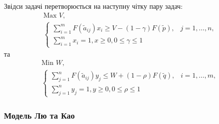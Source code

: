 \documentclass[14pt, a4paper, oneside]{extarticle}
\numberwithin{equation}{section}
\newcommand{\geqslant}{\geq}
\newcommand{\leqslant}{\leq}
\begin{document}
Звідси задачі перетворюється на наступну чітку пару задач:
\begin{equation*}
\begin{aligned}
&\text{Max } V, \\
&\text{} \begin{cases}
\sum_{i=1}^{m} F\left(\tilde{a}_{i j}\right) x_{i} \geqslant V-(1-\gamma) F(\tilde{p}), & j=1,\dots,n, \\
\sum_{i=1}^{m} x_{i}=1, x \geqslant 0, 0 \leqslant \gamma \leqslant 1
\end{cases}
\end{aligned}
\end{equation*}
та
\begin{equation*}
\begin{aligned}
&\text{Min } W , \\
&\text{} \begin{cases}
\sum_{j=1}^{n} F\left(\tilde{a}_{i j}\right) y_{j} \leqslant W+(1-\rho) F(\tilde{q}), & i=1,\dots,m, \\
\sum_{j=1}^{n} y_{j}=1,
y \geqslant 0,
0 \leqslant \rho \leqslant 1
\end{cases}
\end{aligned}
\end{equation*}

\subsubsection{Модель Лю та Као}
\end{document}
